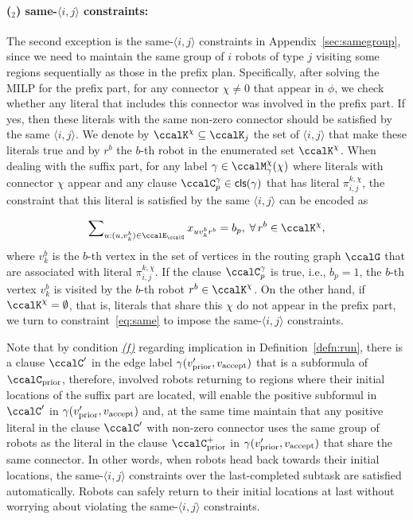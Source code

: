 \documentclass[Afour,sageh,times]{sagej}
\newcounter{mycounter}
\newcommand{\clause}[1]{\mathsf{cls}(#1)}
\newcommand{\vertex}[1]{v_{\textup{#1}}}
\newcommand{\ag}[2]{\langle#1,#2\rangle}
\renewcommand{\ap}[3]{\mathcal{\pi}_{{#1},{#2}}^{#3}}
\newcommand{\aap}[4]{\mathcal{\pi}_{{#1},{#2}}^{#3,#4}}
\begin{document}
{{\paragraph{($_2$) same-$\ag{i}{j}$ constraints:} The second exception is the same-$\ag{i}{j}$ constraints in Appendix~\ref{sec:samegroup}, since we need to maintain the same group of $i$ robots of type $j$ visiting some regions sequentially as those in the prefix plan. Specifically, after solving the MILP for the prefix part, for any connector $\chi\not=0$ that appear in $\phi$, we check whether any literal that includes this connector was involved in the prefix part. If yes, then these literals with the same non-zero connector should be satisfied by the same $\ag{i}{j}$. We denote by $\ccalK^\chi \subseteq \ccalK_j$ the set of $\ag{i}{j}$ that make these literals true and  by  $r^b$ the $b$-th robot in the enumerated set $\ccalK^\chi$. When dealing with the suffix part, for any label $\gamma \in\ccalM_\mathsf{\gamma}^\chi(\chi)$ where literals with connector $\chi$ appear and any clause $\ccalC_p^\gamma \in \clause{\gamma}$ that has  literal $\aap{i}{j}{k}{\chi}$, the constraint that this literal is satisfied by the same $\ag{i}{j}$  can be encoded as}
\begingroup\makeatletter{}\check@mathfonts
\def\maketag@@@#1{\hbox{\m@th\normalsize\normalfont#1}}%
\begin{align}\label{eq:same_suffix}
    \sum\nolimits_{u:(u, v_k^b) \in \ccalE_\ccalG} x_{u v_k^b r^b} =  b_p, \;\forall\, r^b \in \ccalK^\chi,
  \end{align}
\endgroup
where $v_k^b$ is the $b$-th vertex in the set of vertices in the routing graph $\ccalG$  that are associated with literal $\ap{i}{j}{k,\chi}$. If the clause $\ccalC_p^\gamma$ is true, i.e.,  $b_p=1$, the $b$-th vertex $v_k^b$ is visited by the $b$-th robot $r^b \in \ccalK^\chi$. On the other hand, if $\ccalK^\chi = \emptyset$, that is, literals that share this $\chi$ do not appear in the prefix part, we turn to constraint~\eqref{eq:same} to impose the same-$\ag{i}{j}$ constraints.

Note that by condition \hyperref[cond:f]{\it (f)} regarding implication in Definition~\ref{defn:run}, there is a clause  $\ccalC'$ in the edge label $\gamma(\vertex{prior}', \vertex{accept})$ that is a subformula of $\ccalC_{\text{prior}}$,  therefore, involved robots returning to regions where their initial locations of the suffix part are located,  will enable the positive subformul in $\ccalC'$ in $\gamma(\vertex{prior}', \vertex{accept})$ and, at the same time maintain that any positive literal in the clause $\ccalC'$ with non-zero connector uses the same group of robots as the literal in the clause $\ccalC_{\text{prior}}^+$ in $\gamma(\vertex{prior}', \vertex{accept})$ that share  the same connector.  In other words, when robots head back towards their initial locations, the same-$\ag{i}{j}$ constraints over the last-completed subtask are satisfied automatically. Robots can safely return to their initial locations at last without worrying about violating the same-$\ag{i}{j}$ constraints.

}
\end{document}
